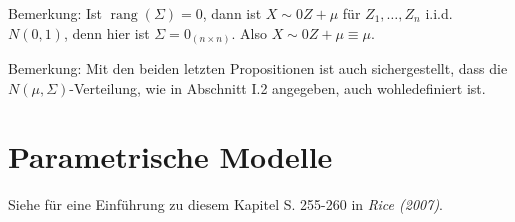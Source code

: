 \documentclass{tstextbook}
\DeclareMathOperator{\rang}{rang}
\begin{document}
\begin{remark}
	Bemerkung: Ist $ \rang(\Sigma) = 0 $, dann ist $ X\sim 0Z+\mu $ für $ Z_1,\ldots, Z_n $ i.i.d. $ N(0,1) $, denn hier ist $ \Sigma = 0_{(n\times n)} $. Also $ X \sim 0Z +\mu \equiv \mu. $
\end{remark}	

\begin{remark}
	Bemerkung: Mit den beiden letzten Propositionen ist auch sichergestellt, dass die $ N(\mu, \Sigma) $-Verteilung, wie in Abschnitt I.2 angegeben, auch wohledefiniert ist.
\end{remark}





\chapter{Parametrische Modelle}

\begin{book}
	Siehe für eine Einführung zu diesem Kapitel S. 255-260 in \textit{Rice (2007)}.
\end{book}
\end{document}
